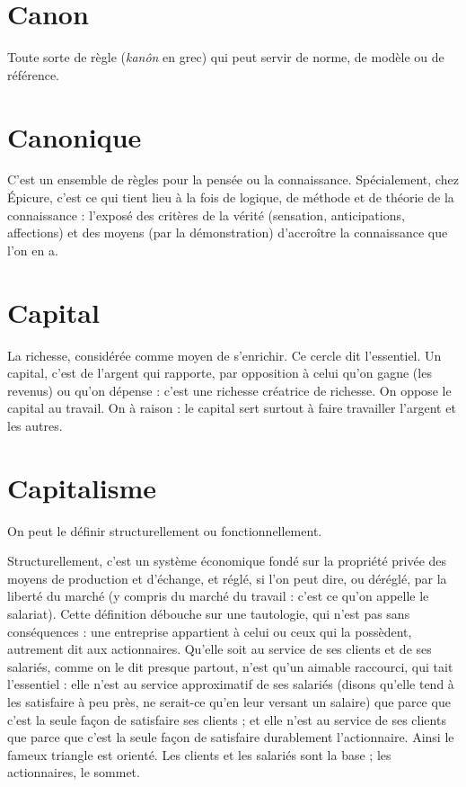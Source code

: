 \section{Canon}
Toute sorte de règle ({\it kanôn} en grec) qui peut servir de norme, de
modèle ou de référence.

\section{Canonique}
C’est un ensemble de règles pour la pensée ou la connaissance.
Spécialement, chez Épicure, c’est ce qui tient lieu à la
fois de logique, de méthode et de théorie de la connaissance : l’exposé des critères
de la vérité (sensation, anticipations, affections) et des moyens (par la
démonstration) d’accroître la connaissance que l’on en a.

\section{Capital}
La richesse, considérée comme moyen de s'enrichir. Ce cercle dit
l'essentiel. Un capital, c’est de l’argent qui rapporte, par opposition
à celui qu'on gagne (les revenus) ou qu’on dépense : c’est une richesse
créatrice de richesse.
On oppose le capital au travail. On à raison : le capital sert surtout à faire
travailler l’argent et les autres.

\section{Capitalisme}
On peut le définir structurellement ou fonctionnellement.

Structurellement, c’est un système économique fondé sur la
propriété privée des moyens de production et d'échange, et réglé, si l’on peut dire,
ou déréglé, par la liberté du marché (y compris du marché du travail : c’est ce qu’on
appelle le salariat). Cette définition débouche sur une tautologie, qui n’est pas sans
conséquences : une entreprise appartient à celui ou ceux qui la possèdent, autrement
dit aux actionnaires. Qu'elle soit au service de ses clients et de ses salariés,
comme on le dit presque partout, n’est qu’un aimable raccourci, qui tait l'essentiel :
elle n’est au service approximatif de ses salariés (disons qu’elle tend à les satisfaire à
peu près, ne serait-ce qu’en leur versant un salaire) que parce que c’est la seule façon
de satisfaire ses clients ; et elle n’est au service de ses clients que parce que c’est la
seule façon de satisfaire durablement l'actionnaire. Ainsi le fameux triangle est
orienté. Les clients et les salariés sont la base ; les actionnaires, le sommet.

